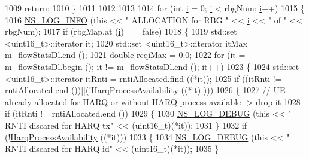 \begin{DoxyCode}
1009       \textcolor{keywordflow}{return};
1010     \}
1011 
1012 
1013 
1014   \textcolor{keywordflow}{for} (\textcolor{keywordtype}{int} \hyperlink{bernuolliDistribution_8m_a6f6ccfcf58b31cb6412107d9d5281426}{i} = 0; \hyperlink{bernuolliDistribution_8m_a6f6ccfcf58b31cb6412107d9d5281426}{i} < rbgNum; \hyperlink{bernuolliDistribution_8m_a6f6ccfcf58b31cb6412107d9d5281426}{i}++)
1015     \{
1016       \hyperlink{group__logging_gafbd73ee2cf9f26b319f49086d8e860fb}{NS\_LOG\_INFO} (\textcolor{keyword}{this} << \textcolor{stringliteral}{" ALLOCATION for RBG "} << \hyperlink{bernuolliDistribution_8m_a6f6ccfcf58b31cb6412107d9d5281426}{i} << \textcolor{stringliteral}{" of "} << rbgNum);
1017       \textcolor{keywordflow}{if} (rbgMap.at (\hyperlink{bernuolliDistribution_8m_a6f6ccfcf58b31cb6412107d9d5281426}{i}) == \textcolor{keyword}{false})
1018         \{
1019           std::set <uint16\_t>::iterator it;
1020           std::set <uint16\_t>::iterator itMax = \hyperlink{classns3_1_1TtaFfMacScheduler_ad59f8b7a0e70380e5e55053fa07a5ebc}{m\_flowStatsDl}.end ();
1021           \textcolor{keywordtype}{double} rcqiMax = 0.0;
1022           \textcolor{keywordflow}{for} (it = \hyperlink{classns3_1_1TtaFfMacScheduler_ad59f8b7a0e70380e5e55053fa07a5ebc}{m\_flowStatsDl}.begin (); it != \hyperlink{classns3_1_1TtaFfMacScheduler_ad59f8b7a0e70380e5e55053fa07a5ebc}{m\_flowStatsDl}.end (); it++)
1023             \{
1024               std::set <uint16\_t>::iterator itRnti = rntiAllocated.find ((*it));
1025               \textcolor{keywordflow}{if} ((itRnti != rntiAllocated.end ())||(!\hyperlink{classns3_1_1TtaFfMacScheduler_a3a48b5c8377a948e09078760eae6348b}{HarqProcessAvailability} ((*it)
      )))
1026                 \{
1027                   \textcolor{comment}{// UE already allocated for HARQ or without HARQ process available -> drop it}
1028                   \textcolor{keywordflow}{if} (itRnti != rntiAllocated.end ())
1029                   \{
1030                     \hyperlink{group__logging_ga413f1886406d49f59a6a0a89b77b4d0a}{NS\_LOG\_DEBUG} (\textcolor{keyword}{this} << \textcolor{stringliteral}{" RNTI discared for HARQ tx"} << (uint16\_t)(*it));
1031                   \}
1032                   \textcolor{keywordflow}{if} (!\hyperlink{classns3_1_1TtaFfMacScheduler_a3a48b5c8377a948e09078760eae6348b}{HarqProcessAvailability} ((*it)))
1033                   \{
1034                     \hyperlink{group__logging_ga413f1886406d49f59a6a0a89b77b4d0a}{NS\_LOG\_DEBUG} (\textcolor{keyword}{this} << \textcolor{stringliteral}{" RNTI discared for HARQ id"} << (uint16\_t)(*it));
1035                   \}

\end{DoxyCode}
